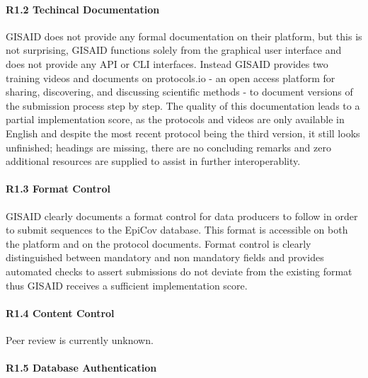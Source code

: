 \documentclass{article}
\begin{document}
\hypertarget{r1.2-techincal-documentation}{%
\paragraph{R1.2 Techincal
Documentation}\label{r1.2-techincal-documentation}}

GISAID does not provide any formal documentation on their platform, but
this is not surprising, GISAID functions solely from the graphical user
interface and does not provide any API or CLI interfaces. Instead GISAID
provides two training videos and documents on protocols.io - an open
access platform for sharing, discovering, and discussing scientific
methods - to document versions of the submission process step by step.
The quality of this documentation leads to a partial implementation
score, as the protocols and videos are only available in English and
despite the most recent protocol being the third version, it still looks
unfinished; headings are missing, there are no concluding remarks and
zero additional resources are supplied to assist in further
interoperablity.

\hypertarget{r1.3-format-control}{%
\paragraph{R1.3 Format Control}\label{r1.3-format-control}}

GISAID clearly documents a format control for data producers to follow
in order to submit sequences to the EpiCov database. This format is
accessible on both the platform and on the protocol documents. Format
control is clearly distinguished between mandatory and non mandatory
fields and provides automated checks to assert submissions do not
deviate from the existing format thus GISAID receives a sufficient
implementation score.

\hypertarget{r1.4-content-control}{%
\paragraph{R1.4 Content Control}\label{r1.4-content-control}}

Peer review is currently unknown.

\hypertarget{r1.5-database-authentication}{%
\paragraph{R1.5 Database
Authentication}\label{r1.5-database-authentication}}
\end{document}
